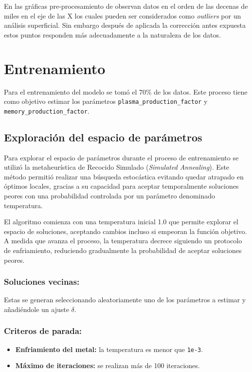 En las gráficas pre-procesamiento de observan datos en el orden de las decenas de miles en el eje de las X los cuales pueden ser considerados como \textit{outliers} por un análisis superficial. Sin embargo después de aplicada la corrección antes expuesta estos puntos responden más adecuadamente a la naturaleza de los datos.


\section{Entrenamiento}
Para el entrenamiento del modelo se tomó el 70\% de los datos. Este proceso tiene como objetivo estimar los parámetros \texttt{plasma\_production\_factor} y \texttt{memory\_production\_factor}.

\subsection{Exploración del espacio de parámetros}

Para explorar el espacio de parámetros durante el proceso de entrenamiento se utilizó la metaheurística de Recocido Simulado (\textit{Simulated Annealing}). Este método permitió realizar una búsqueda estocástica evitando quedar atrapado en óptimos locales, gracias a su capacidad para aceptar temporalmente soluciones peores con una probabilidad controlada por un parámetro denominado temperatura.

El algoritmo comienza con una temperatura inicial 1.0 que permite explorar el espacio de soluciones, aceptando cambios incluso si empeoran la función objetivo. A medida que avanza el proceso, la temperatura decrece siguiendo un protocolo de enfriamiento, reduciendo gradualmente la probabilidad de aceptar soluciones peores.

\subsubsection{Soluciones vecinas:}
Estas se generan seleccionando aleatoriamente uno de los parámetros a estimar y añadiéndole un ajuste $\delta$.

\subsubsection{Criteros de parada:}
\begin{itemize}
    \item \textbf{Enfriamiento del metal:} la temperatura es menor que \texttt{1e-3}.
    \item \textbf{Máximo de iteraciones:} se realizan más de 100 iteraciones.
\end{itemize}



